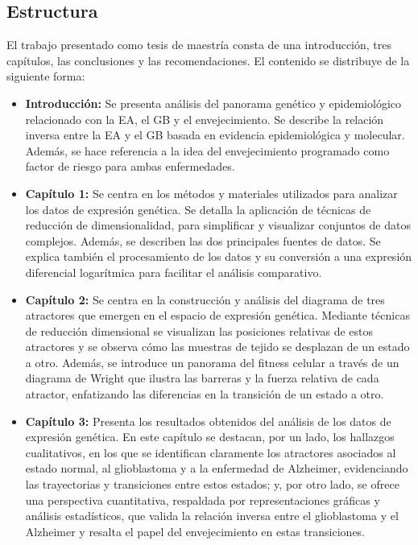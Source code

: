 \subsection*{Estructura}

El trabajo presentado como tesis de maestría consta de una introducción, tres capítulos, las conclusiones y las recomendaciones. El contenido se distribuye de la siguiente forma:

\begin{itemize}
	\item[$\bullet$] \textbf{Introducción:} Se presenta análisis del panorama genético y epidemiológico relacionado con la EA, el GB y el envejecimiento. Se describe la relación inversa entre la EA y el GB basada en evidencia epidemiológica y molecular. Además, se hace referencia a la idea del envejecimiento programado como factor de riesgo para ambas enfermedades.
	
	\item[$\bullet$] \textbf{Capítulo 1:} Se centra en los métodos y materiales utilizados para analizar los datos de expresión genética. Se detalla la aplicación de técnicas de reducción de dimensionalidad, para simplificar y visualizar conjuntos de datos complejos. Además, se describen las dos principales fuentes de datos. Se explica también el procesamiento de los datos y su conversión a una expresión diferencial logarítmica para facilitar el análisis comparativo.
	
	\item[$\bullet$] \textbf{Capítulo 2:} Se centra en la construcción y análisis del diagrama de tres atractores que emergen en el espacio de expresión genética. Mediante técnicas de reducción dimensional se visualizan las posiciones relativas de estos atractores y se observa cómo las muestras de tejido se desplazan de un estado a otro. Además, se introduce un panorama del fitness celular a través de un diagrama de Wright que ilustra las barreras y la fuerza relativa de cada atractor, enfatizando las diferencias en la transición de un estado a otro.
	
	\item[$\bullet$] \textbf{Capítulo 3:} Presenta los resultados obtenidos del análisis de los datos de expresión genética. En este capítulo se destacan, por un lado, los hallazgos cualitativos, en los que se identifican claramente los atractores asociados al estado normal, al glioblastoma y a la enfermedad de Alzheimer, evidenciando las trayectorias y transiciones entre estos estados; y, por otro lado, se ofrece una perspectiva cuantitativa, respaldada por representaciones gráficas y análisis estadísticos, que valida la relación inversa entre el glioblastoma y el Alzheimer y resalta el papel del envejecimiento en estas transiciones.
	

\end{itemize}
